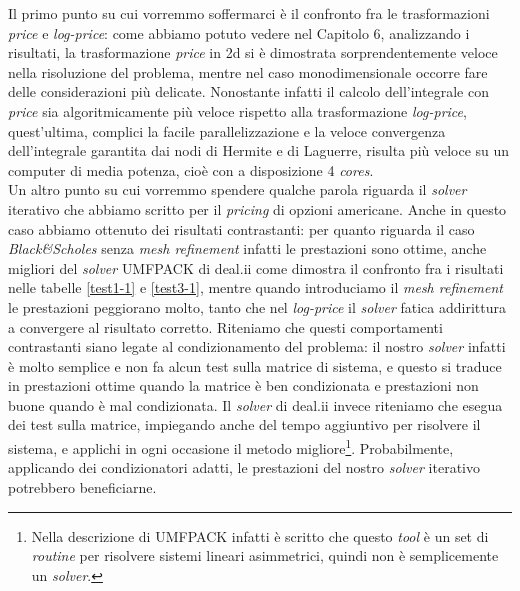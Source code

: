 \documentclass[a4paper,10pt]{report}
\theoremstyle{plain}
\theoremstyle{definition}
\theoremstyle{remark}
\begin{document}
Il primo punto su cui vorremmo soffermarci \`e il confronto fra le trasformazioni \emph{price} e \emph{log-price}: come abbiamo potuto vedere nel Capitolo 6, analizzando i risultati, la trasformazione \emph{price} in 2d si \`e dimostrata sorprendentemente veloce nella risoluzione del problema, mentre nel caso monodimensionale occorre fare delle considerazioni pi\`u delicate. Nonostante infatti il calcolo dell'integrale con \emph{price} sia algoritmicamente pi\`u veloce rispetto alla trasformazione \emph{log-price}, quest'ultima, complici la facile parallelizzazione e la veloce convergenza dell'integrale garantita dai nodi di Hermite e di Laguerre, risulta pi\`u veloce su un computer di media potenza, cio\`e con a disposizione 4 \emph{cores}.\\

Un altro punto su cui vorremmo spendere qualche parola riguarda il \emph{solver} iterativo che abbiamo scritto per il \emph{pricing} di opzioni americane. Anche in questo caso abbiamo ottenuto dei risultati contrastanti: per quanto riguarda il caso \emph{Black\&Scholes} senza \emph{mesh refinement} infatti le prestazioni sono ottime, anche migliori del \emph{solver} \textsf{UMFPACK} di \textsf{deal.ii} come dimostra il confronto fra i risultati nelle tabelle \ref{test1-1} e \ref{test3-1}, mentre quando introduciamo il \emph{mesh refinement} le prestazioni peggiorano molto, tanto che nel \emph{log-price} il \emph{solver} fatica addirittura a convergere al risultato corretto. Riteniamo che questi comportamenti contrastanti siano legate al condizionamento del problema: il nostro \emph{solver} infatti \`e molto semplice e non fa alcun test sulla matrice di sistema, e questo si traduce in prestazioni ottime quando la matrice \`e ben condizionata e prestazioni non buone quando \`e mal condizionata. Il \emph{solver} di \textsf{deal.ii} invece riteniamo che esegua dei test sulla matrice, impiegando anche del tempo aggiuntivo per risolvere il sistema, e applichi in ogni occasione il metodo migliore\footnote{Nella descrizione di \textsf{UMFPACK} infatti \`e scritto che questo \emph{tool} \`e un set di \emph{routine} per risolvere sistemi lineari asimmetrici, quindi non \`e semplicemente un \emph{solver}.}. Probabilmente, applicando dei condizionatori adatti, le prestazioni del nostro \emph{solver} iterativo potrebbero beneficiarne.\\
\end{document}
